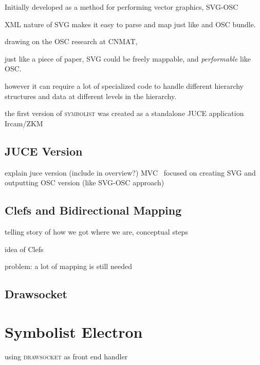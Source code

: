 \documentclass{article}
\def\symbolist{\textsc{symbolist}\xspace}
\def\drawsocket{\textsc{drawsocket}\xspace}
\begin{document}
Initially developed as a method for performing vector graphics, 
SVG-OSC  \cite{gottfried2015svg}

\cite{maccallum2015dynamic} %
\cite{freed2014io} %


XML nature of SVG makes it easy to parse and map just like and OSC bundle.

drawing on the OSC research at CNMAT, 

just like a piece of paper, SVG could be freely mappable, and \textit{performable} like OSC.





however it can require a lot of specialized code to handle different hierarchy structures and data at different levels in the hierarchy.


the first version of \symbolist was created as a standalone JUCE application
Ircam/ZKM~\cite{gottfried2018symbolist}

\subsection{JUCE Version}\label{sec:juce_version}

explain juce version (include in overview?)
MVC~\cite{krasner1988description}
focused on creating SVG and outputting OSC version (like SVG-OSC approach)


\subsection{Clefs and Bidirectional Mapping}\label{sec:bidirectional_mapping}

telling story of how we got where we are, conceptual steps

idea of Clefs

problem:
a lot of mapping is still needed

\subsection{Drawsocket}\label{sec:drawsocket}


\section{Symbolist Electron}\label{sec:symbolist_electron}

using \drawsocket as front end handler \cite{gottfried2019drawsocket}
\end{document}
